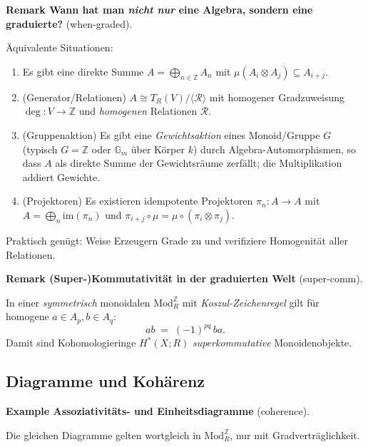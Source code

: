 \documentclass[10pt, letterpaper]{article}
\newcommand{\id}{\operatorname{id}}
\newcommand{\Mod}{\mathrm{Mod}}
\newcommand{\CustomHeading}[3]{%
  \par\medskip\noindent%
  \textbf{#1 #2} \textnormal{(#3)}.\enskip%
}
\newenvironment{REM}[2]{\begin{unitbox}\CustomHeading{Remark}{#1}{#2}}{\end{unitbox}}
\newenvironment{EXA}[2]{\begin{unitbox}\CustomHeading{Example}{#1}{#2}}{\end{unitbox}}
\begin{document}
\begin{REM}{Wann hat man \emph{nicht nur} eine Algebra, sondern eine graduierte?}{when-graded}
Äquivalente Situationen:
\begin{enumerate}[leftmargin=*]
  \item Es gibt eine direkte Summe \(A=\bigoplus_{n\in\mathbb{Z}}A_n\) mit \(\mu(A_i\otimes A_j)\subseteq A_{i+j}\).
  \item (Generator/Relationen) \(A\cong T_R(V)/\langle \mathcal{R}\rangle\) mit homogener Gradzuweisung \(\deg:V\to\mathbb{Z}\) und \emph{homogenen} Relationen \(\mathcal{R}\).
  \item (Gruppenaktion) Es gibt eine \emph{Gewichtsaktion} eines Monoid/Gruppe \(G\) (typisch \(G=\mathbb{Z}\) oder \(\mathbb{G}_m\) über Körper \(k\)) durch Algebra-Automorphismen, so dass
        \(A\) als direkte Summe der Gewichtsräume zerfällt; die Multiplikation addiert Gewichte.
  \item (Projektoren) Es existieren idempotente Projektoren \(\pi_n:A\to A\) mit \(A=\bigoplus_n \mathrm{im}(\pi_n)\) und \(\pi_{i+j}\circ\mu=\mu\circ(\pi_i\otimes\pi_j)\).
\end{enumerate}
Praktisch genügt: Weise Erzeugern Grade zu und verifiziere Homogenität aller Relationen.
\end{REM}

\begin{REM}{(Super-)Kommutativität in der graduierten Welt}{super-comm}
In einer \emph{symmetrisch} monoidalen \(\Mod_R^{\mathbb{Z}}\) mit \emph{Koszul-Zeichenregel} gilt für homogene \(a\in A_p,b\in A_q\):
\[
ab \;=\; (-1)^{pq}\,ba.
\]
Damit sind Kohomologieringe \(H^\ast(X;R)\) \emph{superkommutative} Monoidenobjekte.
\end{REM}

\subsection{Diagramme und Kohärenz}

\begin{EXA}{Assoziativitäts- und Einheitsdiagramme}{coherence}
\begin{center}

\bigskip

\end{center}
Die gleichen Diagramme gelten wortgleich in \(\Mod_R^{\mathbb{Z}}\), nur mit Gradverträglichkeit.
\end{EXA}
\end{document}
